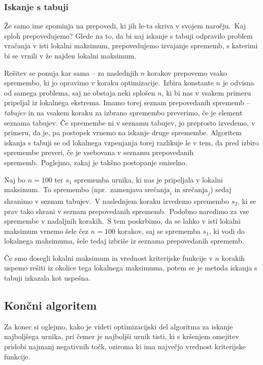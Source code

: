 \documentclass[a4paper,10pt]{article}
\begin{document}
\subsubsection{Iskanje s tabuji}

Že samo ime spominja na prepovedi, ki jih le-ta skriva v svojem naročju.\ Kaj sploh prepovedujemo?
Glede na to, da bi naj iskanje s tabuji odpravilo problem vračanja v isti lokalni maksimum,
prepovedujemo izvajanje sprememb, s katerimi bi se vrnili v že najden lokalni maksimum.

Rešitev se ponuja kar sama -- za naslednjih \(n\) korakov prepovemo vsako spremembo, ki jo
opravimo v koraku optimizacije.\ Izbira konstante \(n\) je odvisna od samega problema, saj
ne obstaja neki splošen \(n\), ki bi nas v vsakem primeru pripeljal iz lokalnega ekstrema.
Imamo torej seznam prepovedanih sprememb -- \emph{tabujev} in na vsakem koraku za izbrano
spremembo preverimo, če je element seznama tabujev. Če spremembe ni v seznamu tabujev, jo
preprosto izvedemo, v primeru, da je, pa postopek vrnemo na iskanje druge spremembe.
Algoritem iskanja s tabuji se od lokalnega vzpenjanja torej razlikuje le v tem, da pred
izbiro spremembe preveri, če je vsebovana v seznamu prepovedanih sprememb.\ Poglejmo, zakaj
je takšno postopanje smiselno.

Naj bo \(n = 100\) ter \(s_1\) sprememba urnika, ki nas je pripeljala v lokalni maksimum.\ To
spremembo (npr.\ zamenjava \(\text{srečanja}_i\) in \(\text{srečanja}_j\)) sedaj shranimo v
seznam tabujev.\ V naslednjem koraku izvedemo spremembo \(s_2\), ki se prav tako shrani v
seznam prepovedanih sprememb.\ Podobno naredimo za vse spremembe v nadaljnih korakih.\ S
tem poskrbimo, da se lahko v isti lokalni maksimum vrnemo šele čez \(n = 100\) korakov, saj
se sprememba \(s_1\), ki vodi do lokalnega maksimuma, šele tedaj izbriše iz seznama
prepovedanih sprememb.

Če smo dosegli lokalni maksimum in vrednost kriterijske funkcije v \(n\) korakih uspemo
rešiti iz okolice tega lokalnega maksimuma, potem se je metoda iskanja s tabuji izkazala
kot uspešna.

\subsection{Končni algoritem}

Za konec si oglejmo, kako je videti optimizacijski del algoritma za iskanje najboljšega
urnika, pri čemer je najboljši urnik tisti, ki s kršenjem omejitev pridobi najmanj negativnih
točk, oziroma ki ima največjo vrednost kriterijske funkcije.
\end{document}
